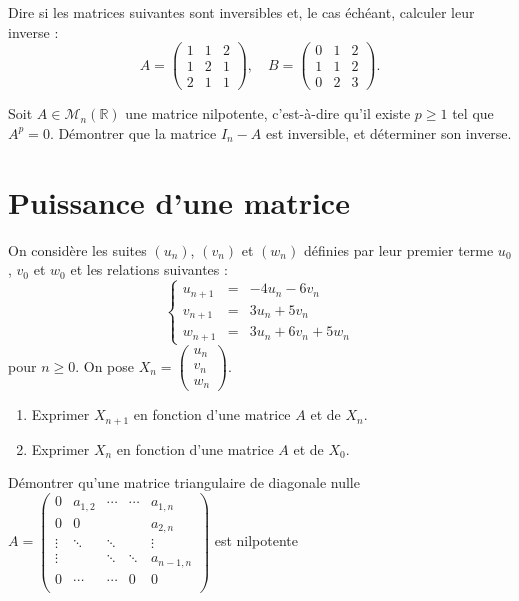 \documentclass{book}
\begin{document}
\begin{Exercice}

Dire si les matrices suivantes sont inversibles et, le
cas échéant, calculer leur inverse :
$$A=\left(
\begin{array}{rcl}
1&1&2\\
1&2&1\\
2&1&1
\end{array}
\right),\quad
B=\left(
\begin{array}{rcl}
0&1&2\\
1&1&2\\
0&2&3
\end{array}
\right).$$
\end{Exercice}

\begin{Exercice}

Soit $A\in\mathcal M_n(\mathbb R)$ une matrice nilpotente, c'est-à-dire qu'il existe $p\geq 1$ tel que $A^p=0$. Démontrer que la matrice $I_n-A$ est inversible, et déterminer son inverse.
\end{Exercice}
\section{Puissance d'une matrice}
\begin{Exercice}
On considère les suites $(u_n)$, $(v_n)$ et $(w_n)$ définies par leur premier terme
$u_0$, $v_0$ et $w_0$ et les relations suivantes :
$$\left\{
\begin{array}{rcl}
u_{n+1}&=&-4u_n-6v_n\\
v_{n+1}&=&3u_n+5v_n\\
w_{n+1}&=&3u_n+6v_n+5w_n
\end{array}
\right.$$
pour $n\geq 0$. On pose $X_n=\left(
\begin{array}{c}u_n\\v_n\\w_n\end{array}\right)$.
\begin{enumerate}
\item Exprimer $X_{n+1}$ en fonction d'une matrice $A$ et de $X_n$.
\item  Exprimer $X_{n}$ en fonction d'une matrice $A$ et de $X_0$.
\end{enumerate}
\end{Exercice}
\begin{Exercice}

Démontrer qu'une matrice triangulaire de diagonale nulle  $A=\begin{pmatrix}0&a_{1,2}&\cdots &\cdots &a_{1,n}\\0&0&&&a_{2,n}\\\vdots &\ddots &\ddots &&\vdots \\\vdots &&\ddots &\ddots &a_{n-1,n}\\0&\cdots &\cdots &0&0\\\end{pmatrix}$ est nilpotente
\end{Exercice}
\end{document}
